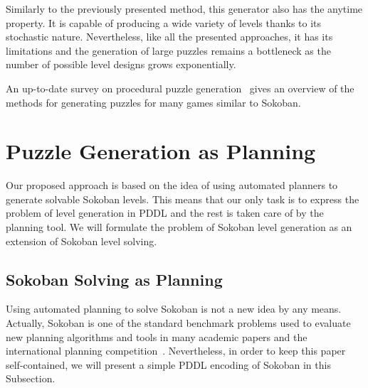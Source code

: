 \documentclass[runningheads]{llncs}
\begin{document}
Similarly to the previously presented method, this generator also has the anytime property. It is capable of
producing a wide variety of levels thanks to its stochastic nature. Nevertheless, like all the presented approaches,
it has its limitations and the generation of large puzzles remains a bottleneck as the
number of possible level designs grows exponentially.

An up-to-date survey on procedural puzzle generation~\cite{de2019procedural} gives an overview
of the methods for generating puzzles for many games similar to Sokoban.

\section{Puzzle Generation as Planning}
Our proposed approach is based on the idea of using automated planners to generate solvable Sokoban levels.
This means that our only task is to express the problem of level generation in PDDL and the rest is taken care of
by the planning tool. We will formulate the problem of Sokoban level generation as an extension of Sokoban
level solving.

\subsection{Sokoban Solving as Planning} \label{sec-asPlanning}
Using automated planning to solve Sokoban is not a new idea by any means. Actually, Sokoban is one of the
standard benchmark problems used to evaluate new planning algorithms and tools in many academic papers
and the international planning competition~\cite{ipc}. Nevertheless, in order to keep this paper self-contained,
we will present a simple PDDL encoding of Sokoban in this Subsection.
\end{document}
